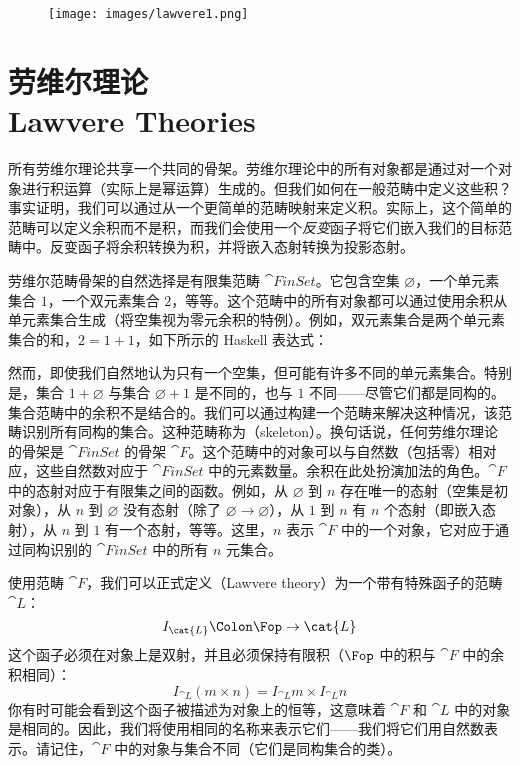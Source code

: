 \begin{figure}[H]
  \centering
  \texttt{[image: images/lawvere1.png]}
\end{figure}

\section{劳维尔理论\\ \textmd{Lawvere Theories}}

所有劳维尔理论共享一个共同的骨架。劳维尔理论中的所有对象都是通过对一个对象进行积运算（实际上是幂运算）生成的。但我们如何在一般范畴中定义这些积？事实证明，我们可以通过从一个更简单的范畴映射来定义积。实际上，这个简单的范畴可以定义余积而不是积，而我们会使用一个\emph{反变}函子将它们嵌入我们的目标范畴中。反变函子将余积转换为积，并将嵌入态射转换为投影态射。

劳维尔范畴骨架的自然选择是有限集范畴 $\cat{FinSet}$。它包含空集 $\varnothing$，一个单元素集合 $1$，一个双元素集合 $2$，等等。这个范畴中的所有对象都可以通过使用余积从单元素集合生成（将空集视为零元余积的特例）。例如，双元素集合是两个单元素集合的和，$2 = 1 + 1$，如下所示的 Haskell 表达式：

然而，即使我们自然地认为只有一个空集，但可能有许多不同的单元素集合。特别是，集合 $1 + \varnothing$ 与集合 $\varnothing + 1$ 是不同的，也与 $1$ 不同——尽管它们都是同构的。集合范畴中的余积不是结合的。我们可以通过构建一个范畴来解决这种情况，该范畴识别所有同构的集合。这种范畴称为（skeleton）。换句话说，任何劳维尔理论的骨架是 $\cat{FinSet}$ 的骨架 $\cat{F}$。这个范畴中的对象可以与自然数（包括零）相对应，这些自然数对应于 $\cat{FinSet}$ 中的元素数量。余积在此处扮演加法的角色。$\cat{F}$ 中的态射对应于有限集之间的函数。例如，从 $\varnothing$ 到 $n$ 存在唯一的态射（空集是初对象），从 $n$ 到 $\varnothing$ 没有态射（除了 $\varnothing \to \varnothing$），从 $1$ 到 $n$ 有 $n$ 个态射（即嵌入态射），从 $n$ 到 $1$ 有一个态射，等等。这里，$n$ 表示 $\cat{F}$ 中的一个对象，它对应于通过同构识别的 $\cat{FinSet}$ 中的所有 $n$ 元集合。

使用范畴 $\cat{F}$，我们可以正式定义（Lawvere theory）为一个带有特殊函子的范畴 $\cat{L}$：
\[I_{\cat{L}} \Colon \Fop \to \cat{L}\]
这个函子必须在对象上是双射，并且必须保持有限积（$\Fop$ 中的积与 $\cat{F}$ 中的余积相同）：
\[I_{\cat{L}} (m\times{}n) = I_{\cat{L}} m\times{}I_{\cat{L}} n\]
你有时可能会看到这个函子被描述为对象上的恒等，这意味着 $\cat{F}$ 和 $\cat{L}$ 中的对象是相同的。因此，我们将使用相同的名称来表示它们——我们将它们用自然数表示。请记住，$\cat{F}$ 中的对象与集合不同（它们是同构集合的类）。

